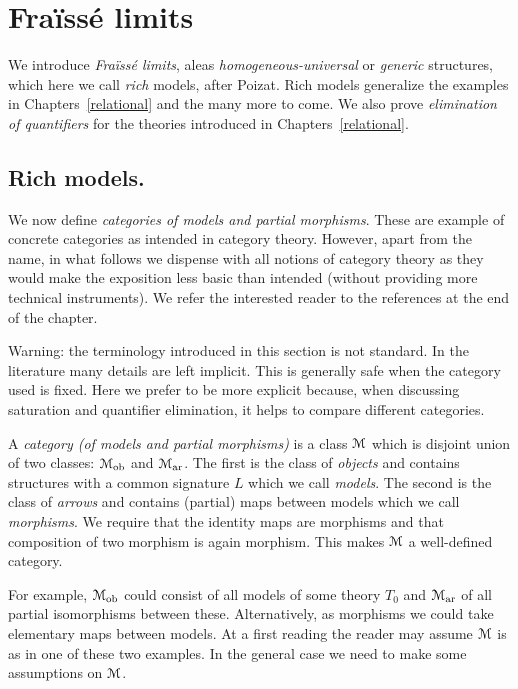 \documentclass[creche.tex]{subfiles}
\begin{document}
\chapter{Fra\"issé limits}
\label{fraisse} 

\def\ceq#1#2#3{\parbox[b]{20ex}{$\displaystyle #1$}\parbox[b]{4ex}{\hfil$#2$}$\displaystyle #3$}

We introduce \textit{Fra\"iss\'e limits}, aleas \textit{homogeneous-universal\/} or \textit{generic\/} structures, which here we call \textit{rich\/} models, after Poizat. Rich models generalize the examples in Chapters~\ref{relational} and the many more to come. We also prove \textit{elimination of quantifiers\/} for the theories introduced in Chapters~\ref{relational}.

\section{Rich models.}\label{rich}
We now define \textit{categories of models and partial morphisms}. These are example of concrete categories as intended in category theory. However, apart from the name, in what follows we dispense with all notions of category theory as they would make the exposition less basic than intended (without providing more technical instruments). We refer the interested reader to the references at the end of the chapter.

\noindent\llap{\textcolor{red}{\Large\danger}\kern1.5ex}Warning: the terminology introduced in this section is not standard. In the literature many details are left implicit. This is generally safe when the category used is fixed. Here we prefer to be more explicit because, when discussing saturation and quantifier elimination, it helps to compare different categories.

A \emph{category (of models and partial morphisms)\/} is a class $\EuScript M$ which is disjoint union of two classes: \emph{$\EuScript M_{\textrm{ob}}$} and \emph{$\EuScript M_{\textrm{ar}}$}. The first is the class of \emph{objects\/} and contains structures with a common signature $L$ which we call \emph{models}. The second is the class of \emph{arrows\/} and contains (partial) maps between models which we call \emph{morphisms}. We require that the identity maps are morphisms and that composition of two morphism is again morphism. This makes $\EuScript M$ a well-defined category. 

For example, $\EuScript M_{\rm ob}$ could consist of all models of some theory $T_0$ and $\EuScript M_{\rm ar}$ of all partial isomorphisms between these. Alternatively, as morphisms we could take elementary maps between models. At a first reading the reader may assume $\EuScript M$ is as in one of these two examples. In the general case we need to make some assumptions on $\EuScript M$.
\end{document}
